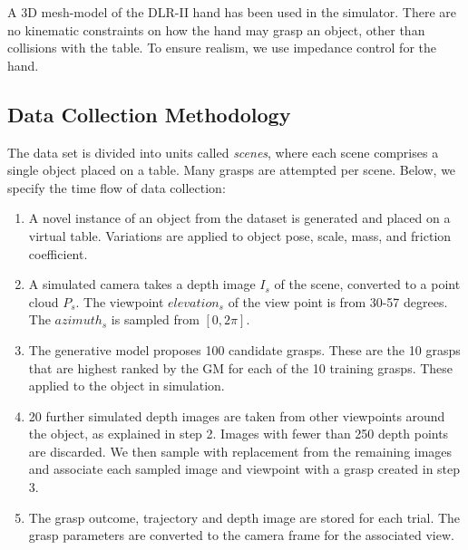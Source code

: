 A 3D mesh-model of the DLR-II hand has been used in the simulator. There are no kinematic constraints on how the hand may grasp an object, other than collisions with the table. To ensure realism, we use impedance control for the hand.

\subsection{Data Collection Methodology}
\label{subsection:dataCollection}

The data set is divided into units called \textit{scenes}, where each scene comprises a single object placed on a table. Many grasps are attempted per scene. Below, we specify the time flow of data collection:

\begin{enumerate}
\item A novel instance of an object from the dataset is generated and placed on a virtual table. Variations are applied to object pose, scale, mass, and friction coefficient.
\item A simulated camera takes a depth image $I_s$ of the scene, converted to a point cloud $P_s$. The viewpoint ${elevation}_s$ of the view point is from 30-57 degrees. The ${azimuth}_s$ is sampled from $[0, 2\pi]$. 
\item The generative model proposes 100 candidate grasps. These are the 10 grasps that are highest ranked by the GM for each of the 10 training grasps. These applied to the object in simulation.
\item 20 further simulated depth images are taken from other viewpoints around the object, as explained in step 2. Images with fewer than 250 depth points are discarded. We then sample with replacement from the remaining images and associate each sampled image and viewpoint with a grasp created in step 3.
\item The grasp outcome, trajectory and depth image are stored for each trial. The grasp parameters are converted to the camera frame for the associated view.
\end{enumerate}

